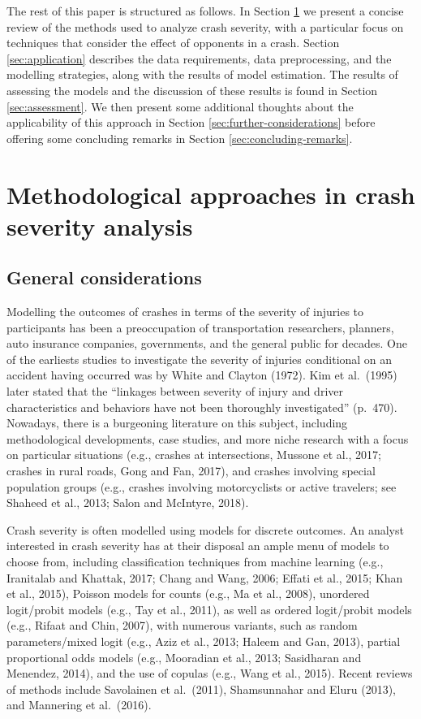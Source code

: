 \documentclass[]{elsarticle} %
\begin{document}
The rest of this paper is structured as follows. In Section
\ref{sec:review-of-methods} we present a concise review of the methods
used to analyze crash severity, with a particular focus on techniques
that consider the effect of opponents in a crash. Section
\ref{sec:application} describes the data requirements, data
preprocessing, and the modelling strategies, along with the results of
model estimation. The results of assessing the models and the discussion
of these results is found in Section \ref{sec:assessment}. We then
present some additional thoughts about the applicability of this
approach in Section \ref{sec:further-considerations} before offering
some concluding remarks in Section \ref{sec:concluding-remarks}.

\hypertarget{sec:review-of-methods}{%
\section{Methodological approaches in crash severity
analysis}\label{sec:review-of-methods}}

\hypertarget{general-considerations}{%
\subsection{General considerations}\label{general-considerations}}

Modelling the outcomes of crashes in terms of the severity of injuries
to participants has been a preoccupation of transportation researchers,
planners, auto insurance companies, governments, and the general public
for decades. One of the earliests studies to investigate the severity of
injuries conditional on an accident having occurred was by White and
Clayton (1972). Kim et al.~(1995) later stated that the ``linkages
between severity of injury and driver characteristics and behaviors have
not been thoroughly investigated'' (p.~470). Nowadays, there is a
burgeoning literature on this subject, including methodological
developments, case studies, and more niche research with a focus on
particular situations (e.g., crashes at intersections, Mussone et al.,
2017; crashes in rural roads, Gong and Fan, 2017), and crashes involving
special population groups (e.g., crashes involving motorcyclists or
active travelers; see Shaheed et al., 2013; Salon and McIntyre, 2018).

Crash severity is often modelled using models for discrete outcomes. An
analyst interested in crash severity has at their disposal an ample menu
of models to choose from, including classification techniques from
machine learning (e.g., Iranitalab and Khattak, 2017; Chang and Wang,
2006; Effati et al., 2015; Khan et al., 2015), Poisson models for counts
(e.g., Ma et al., 2008), unordered logit/probit models (e.g., Tay et
al., 2011), as well as ordered logit/probit models (e.g., Rifaat and
Chin, 2007), with numerous variants, such as random parameters/mixed
logit (e.g., Aziz et al., 2013; Haleem and Gan, 2013), partial
proportional odds models (e.g., Mooradian et al., 2013; Sasidharan and
Menendez, 2014), and the use of copulas (e.g., Wang et al., 2015).
Recent reviews of methods include Savolainen et al.~(2011), Shamsunnahar
and Eluru (2013), and Mannering et al.~(2016).
\end{document}
